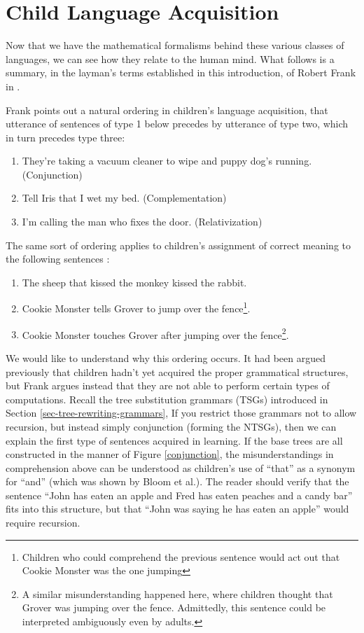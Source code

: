 \documentclass[12pt]{article}
\begin{document}
\section{Child Language Acquisition}

Now that we have the mathematical formalisms behind these various
classes of languages, we can see how they relate to the human mind.
What follows is a summary, in the layman's terms established in this
introduction, of Robert Frank in \cite{Frank-2000}.

Frank points out a natural ordering in children's language acquisition,
that utterance of sentences of type 1 below precedes by utterance of
type two, which in turn precedes type three:

\begin{enumerate}
\item They're taking a vacuum cleaner to wipe and puppy dog's
running.  (Conjunction)
\item Tell Iris that I wet my bed. (Complementation)
\item I'm calling the man who fixes the door.  (Relativization)
\end{enumerate}

The same sort of ordering applies to children's assignment of correct
meaning to the following sentences \cite{Bloom-1980}:

\begin{enumerate}
\item The sheep that kissed the monkey kissed the rabbit.
\item Cookie Monster tells Grover to jump over the
fence\footnote{Children who could comprehend the previous sentence would
act out that Cookie Monster was the one jumping}. 
\item Cookie Monster touches Grover after jumping over the
fence\footnote{A similar misunderstanding happened here, where children
thought that Grover was jumping over the fence.  Admittedly, this
sentence could be interpreted ambiguously even by adults.}.
\end{enumerate}

We would like to understand why this ordering occurs.  It had been
argued previously that children hadn't yet acquired the proper
grammatical structures, but Frank argues instead that they are not able
to perform certain types of computations.  Recall the tree substitution
grammars (TSGs) introduced in Section \ref{sec-tree-rewriting-grammars},
If you restrict those grammars not to allow recursion, but instead
simply conjunction (forming the NTSGs), then we can explain the first
type of sentences acquired in learning. If the base trees are all
constructed in the manner of Figure \ref{conjunction}, the
misunderstandings in comprehension above can be understood as children's
use of ``that'' as a synonym for ``and'' (which was shown by Bloom et
al.).  The reader should verify that the sentence ``John has eaten an
apple and Fred has eaten peaches and a candy bar'' fits into this
structure, but that ``John was saying he has eaten an apple'' would
require recursion.
\end{document}
